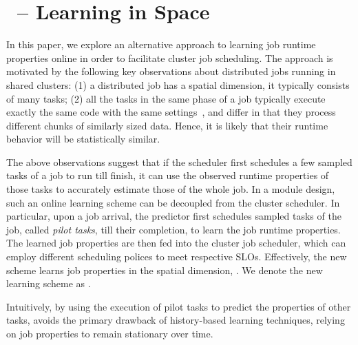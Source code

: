 \section{\lTechnique\ -- Learning in Space}
\label{sec:sampling}

In this paper, we explore an alternative approach to learning job runtime
properties online in order to facilitate cluster job scheduling.  The approach
is motivated by the following
key observations about distributed jobs running in shared clusters: (1) a
distributed job has a spatial dimension, \ie it typically consists of many
tasks; (2) all the tasks in the same phase of a job typically execute exactly
the same code with the same settings~\cite{googleClusterData2011-2Schema,
personalCommunication:MarkAstley}, and  differ in that they process different
chunks of similarly sized data. 
Hence, it is likely that their runtime behavior
will be statistically similar.

The above observations suggest that if the scheduler first schedules a few
sampled tasks of a job to run till finish, it can use the observed runtime
properties of those tasks to accurately estimate those of the whole job. 
In a module design, such an online learning scheme can be decoupled from the
cluster scheduler.  In particular, upon a job arrival, the predictor first
schedules sampled tasks of the job, called {\em pilot tasks}, till their
completion, to learn the job runtime properties. The learned job properties are
then fed into the cluster job scheduler, which can employ different scheduling
polices to meet respective SLOs.  Effectively, the new scheme learns job
properties in the spatial dimension, .  We denote
the new learning scheme  as \lTechnique.


Intuitively, by using the execution of pilot tasks to predict the properties of
other tasks, \lTechnique avoids the primary drawback of history-based learning
techniques, \ie relying on job properties to remain stationary over time.

